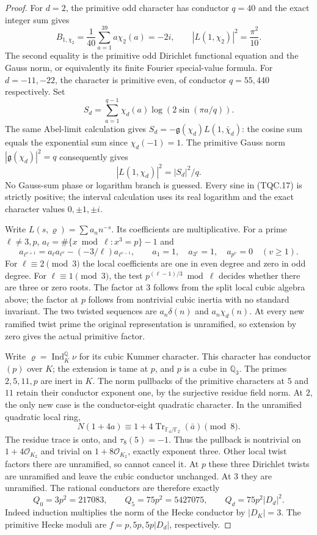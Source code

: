 \begin{proof}
For $d=2$, the primitive odd character has conductor $q=40$ and
the exact integer sum gives
\[
 B_{1,\chi_2}=\frac1{40}\sum_{a=1}^{39}a\chi_2(a)=-2i,
 \qquad |L(1,\chi_2)|^2=\frac{\pi^2}{10}.
 \tag{TQC.16}
\]
The second equality is the primitive odd Dirichlet functional
equation and the Gauss norm, or equivalently its finite Fourier
special-value formula.
For $d=-11,-22$, the character is primitive even, of conductor
$q=55,440$ respectively.  Set
\[
 S_d=\sum_{a=1}^{q-1}\chi_d(a)\log(2\sin(\pi a/q)).
 \tag{TQC.17}
\]
The same Abel-limit calculation gives
$S_d=-\mathfrak g(\chi_d)L(1,\bar\chi_d)$:
the cosine sum equals the exponential sum since $\chi_d(-1)=1$.
The primitive Gauss norm $|\mathfrak g(\chi_d)|^2=q$ consequently gives
\[
                         |L(1,\chi_d)|^2=|S_d|^2/q.
 \tag{TQC.18}
\]
No Gauss-sum phase or logarithm branch is guessed.
Every sine in (TQC.17) is strictly positive; the interval calculation
uses its real logarithm and the exact character values $0,\pm1,\pm i$.

Write $L(s,\varrho)=\sum a_n n^{-s}$.
Its coefficients are multiplicative.  For a prime $\ell\ne3,p$,
$a_\ell=\#\{x\bmod\ell:x^3=p\}-1$ and
\[
 a_{\ell^{v+1}}=a_\ell a_{\ell^v}
                   -(-3/\ell)a_{\ell^{v-1}},\qquad
 a_1=1,\quad a_{3^v}=1,\quad a_{p^v}=0\quad(v\ge1).
 \tag{TQC.19}
\]
For $\ell\equiv2\pmod3$ the local coefficients are one in even
degree and zero in odd degree.  For $\ell\equiv1\pmod3$, the
test $p^{(\ell-1)/3}\bmod\ell$ decides whether there are three
or zero roots.  The factor at $3$ follows from the split local
cubic algebra above; the factor at $p$ follows from nontrivial
cubic inertia with no standard invariant.
The two twisted sequences are $a_n\delta(n)$ and $a_n\chi_d(n)$.
At every new ramified twist prime the original representation is
unramified, so extension by zero gives the actual primitive factor.

Write $\varrho=\operatorname{Ind}_{K}^{\mathbb Q}\nu$ for its cubic
Kummer character.  This character has conductor $(p)$ over $K$;
the extension is tame at $p$, and $p$ is a cube in $\mathbb Q_3$.
The primes $2,5,11,p$ are inert in $K$.
The norm pullbacks of the primitive characters at $5$ and $11$
retain their conductor exponent one, by the surjective residue
field norm.  At $2$, the only new case is the conductor-eight
quadratic character.  In the unramified quadratic local ring,
\[
 N(1+4a)\equiv1+4\operatorname{Tr}_{\mathbb F_4/\mathbb F_2}(\bar a)
                         \pmod8.
 \tag{TQC.20}
\]
The residue trace is onto, and $\tau_8(5)=-1$.
Thus the pullback is nontrivial on $1+4\mathcal O_{K_2}$ and
trivial on $1+8\mathcal O_{K_2}$, exactly exponent three.
Other local twist factors there are unramified, so cannot cancel it.
At $p$ these three Dirichlet twists are unramified and leave the
cubic conductor unchanged.  At $3$ they are unramified.
The rational conductors are therefore exactly
\[
 Q_0=3p^2=217083,\qquad Q_5=75p^2=5427075,
 \qquad Q_d=75p^2|D_d|^2.
 \tag{TQC.21}
\]
Indeed induction multiplies the norm of the Hecke conductor by
$|D_K|=3$.  The primitive Hecke moduli are
$f=p,5p,5p|D_d|$, respectively.


\end{proof}
